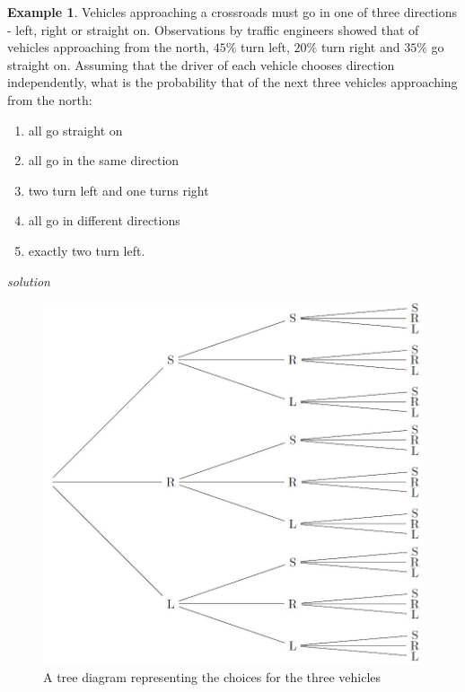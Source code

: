 \documentclass[
]{book}
\theoremstyle{definition}
\theoremstyle{definition}
\newtheorem{example}{Example}[chapter]
\theoremstyle{definition}
\theoremstyle{definition}
\theoremstyle{remark}
\begin{document}
\begin{example}

Vehicles approaching a crossroads must go in one of three directions - left, right or straight on. Observations by traffic engineers showed that of vehicles approaching from the north, \(45\%\) turn left, \(20\%\) turn right and \(35\%\) go straight on. Assuming that the driver of each vehicle chooses direction independently, what is the probability that of the next three vehicles approaching from the north:

\begin{enumerate}
\def\labelenumi{\alph{enumi})}
\item
  all go straight on
\item
  all go in the same direction
\item
  two turn left and one turns right
\item
  all go in different directions
\item
  exactly two turn left.
\end{enumerate}

\end{example}

\emph{solution}

\begin{figure}

{\centering \includegraphics[width=12.26in]{./figures/vehicles} 

}

\caption{A tree diagram representing the choices for the three vehicles}\label{fig:tree}
\end{figure}
\end{document}
